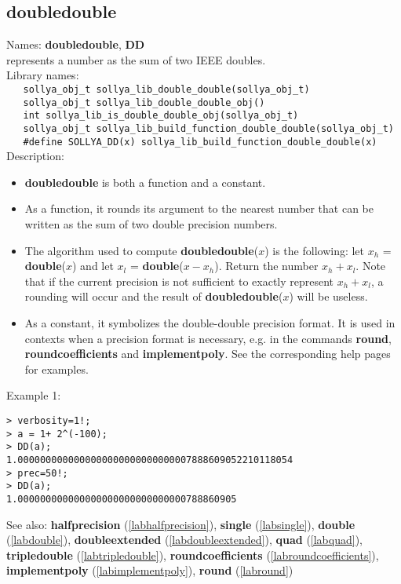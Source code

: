 \subsection{doubledouble}
\label{labdoubledouble}
\noindent Names: \textbf{doubledouble}, \textbf{DD}\\
\phantom{aaa}represents a number as the sum of two IEEE doubles.\\[0.2cm]
\noindent Library names:\\
\verb|   sollya_obj_t sollya_lib_double_double(sollya_obj_t)|\\
\verb|   sollya_obj_t sollya_lib_double_double_obj()|\\
\verb|   int sollya_lib_is_double_double_obj(sollya_obj_t)|\\
\verb|   sollya_obj_t sollya_lib_build_function_double_double(sollya_obj_t)|\\
\verb|   #define SOLLYA_DD(x) sollya_lib_build_function_double_double(x)|\\[0.2cm]
\noindent Description: \begin{itemize}

\item \textbf{doubledouble} is both a function and a constant.

\item As a function, it rounds its argument to the nearest number that can be written
   as the sum of two double precision numbers.

\item The algorithm used to compute \textbf{doubledouble}($x$) is the following: let $x_h$ = \textbf{double}($x$)
   and let $x_l$ = \textbf{double}($x-x_h$). Return the number $x_h+x_l$. Note that if the current 
   precision is not sufficient to exactly represent $x_h + x_l$, a rounding will occur
   and the result of \textbf{doubledouble}($x$) will be useless.

\item As a constant, it symbolizes the double-double precision format. It is used in 
   contexts when a precision format is necessary, e.g. in the commands 
   \textbf{round}, \textbf{roundcoefficients} and \textbf{implementpoly}.
   See the corresponding help pages for examples.
\end{itemize}
\noindent Example 1: 
\begin{center}\begin{minipage}{15cm}\begin{Verbatim}[frame=single]
> verbosity=1!;
> a = 1+ 2^(-100);
> DD(a);
1.0000000000000000000000000000007888609052210118054
> prec=50!;
> DD(a);
1.000000000000000000000000000000788860905
\end{Verbatim}
\end{minipage}\end{center}
See also: \textbf{halfprecision} (\ref{labhalfprecision}), \textbf{single} (\ref{labsingle}), \textbf{double} (\ref{labdouble}), \textbf{doubleextended} (\ref{labdoubleextended}), \textbf{quad} (\ref{labquad}), \textbf{tripledouble} (\ref{labtripledouble}), \textbf{roundcoefficients} (\ref{labroundcoefficients}), \textbf{implementpoly} (\ref{labimplementpoly}), \textbf{round} (\ref{labround})

